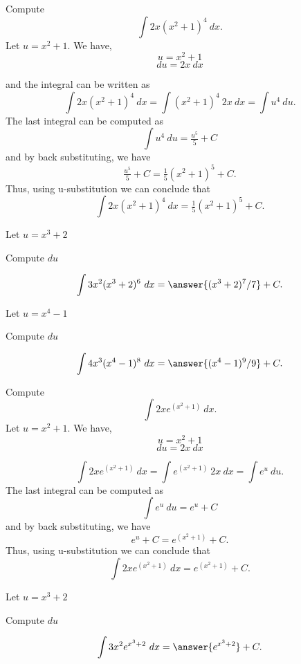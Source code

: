 \documentclass{ximera}
\begin{document}
\begin{example} Compute 
\[\int 2x(x^2 + 1)^4 \ dx.\]
Let $u = x^2 + 1$.  We have,
\[u = x^2 + 1\]
\[du = 2x \ dx\]

and the integral can be written as 
\[\int 2x(x^2 + 1)^4 \ dx = \int (x^2 + 1)^4 \ 2x \  dx = \int u^4 \ du.\]
The last integral can be computed as 
\[\int u^4 \ du = \tfrac{u^5}{5} + C\]
and by back substituting, we have 
\[\tfrac{u^5}{5} + C = \tfrac15(x^2 + 1)^5 + C .\]
Thus, using u-substitution we can conclude that
\[\int 2x(x^2 + 1)^4 \ dx  =  \tfrac15(x^2 + 1)^5 + C .\]
\end{example}

\begin{problem}
\begin{hint}
Let $u = x^3 + 2$
\end{hint}
\begin{hint}
Compute $du$
\end{hint}
\[\int 3x^2(x^3 + 2)^6 \ dx = \answer{(x^3 + 2)^7/7} +C.\]
\end{problem}

\begin{problem}
\begin{hint}
Let $u = x^4 -1$
\end{hint}
\begin{hint}
Compute $du$
\end{hint}
\[\int 4x^3(x^4 -1)^8 \ dx = \answer{(x^4 -1)^9/9} +C.\]
\end{problem}

\begin{example} Compute 
\[\int 2xe^{(x^2 + 1)} \ dx.\]
Let $u = x^2 + 1$.  We have,
\[u = x^2 + 1\]
\[du = 2x \ dx\]

\[\int 2xe^{(x^2 + 1)} \ dx = \int e^{(x^2 + 1)} \ 2x\  dx = \int e^u \ du.\]
The last integral can be computed as 
\[\int e^u \ du = e^u + C\]
and by back substituting, we have 
\[e^u + C = e^{(x^2 + 1)} + C.\]
Thus, using u-substitution we can conclude that
\[\int 2xe^{(x^2 + 1)} \ dx =  e^{(x^2 + 1)} + C.\]
\end{example}

\begin{problem}
\begin{hint}
Let $u = x^3 + 2$
\end{hint}
\begin{hint}
Compute $du$
\end{hint}
\[\int 3x^2e^{x^3 + 2} \ dx = \answer{e^{x^3 + 2}} +C.\]
\end{problem}
\end{document}
